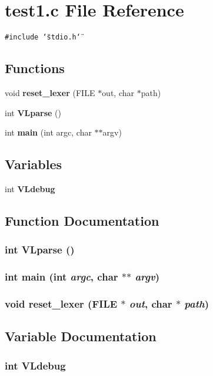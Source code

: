 \section{test1.c File Reference}
\label{test1_8c}
{\tt \#include \char`\"{}stdio.h\char`\"{}}\par
\subsection*{Functions}
\begin{CompactItemize}
\item 
void {\bf reset\_\-lexer} (FILE $\ast$out, char $\ast$path)
\item 
int {\bf VLparse} ()
\item 
int {\bf main} (int argc, char $\ast$$\ast$argv)
\end{CompactItemize}
\subsection*{Variables}
\begin{CompactItemize}
\item 
int {\bf VLdebug}
\end{CompactItemize}


\subsection{Function Documentation}
\subsubsection{\setlength{\rightskip}{0pt plus 5cm}int VLparse ()}\label{test1_8c_a2}


\subsubsection{\setlength{\rightskip}{0pt plus 5cm}int main (int {\em argc}, char $\ast$$\ast$ {\em argv})}\label{test1_8c_a3}


\subsubsection{\setlength{\rightskip}{0pt plus 5cm}void reset\_\-lexer (FILE $\ast$ {\em out}, char $\ast$ {\em path})}\label{test1_8c_a1}




\subsection{Variable Documentation}
\subsubsection{\setlength{\rightskip}{0pt plus 5cm}int VLdebug}\label{test1_8c_a0}


